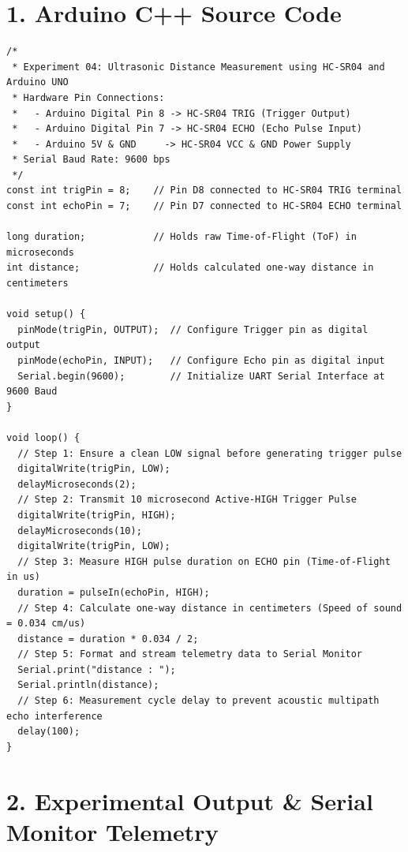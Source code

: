 \documentclass[10pt,a4paper]{article}
\begin{document}
\section*{1. Arduino C++ Source Code}
\begin{lstlisting}[style=bwCode, title={\textbf{Listing 4.1: Microcontroller Firmware for Ultrasonic Distance Measurement.}}]
/*
 * Experiment 04: Ultrasonic Distance Measurement using HC-SR04 and Arduino UNO
 * Hardware Pin Connections:
 *   - Arduino Digital Pin 8 -> HC-SR04 TRIG (Trigger Output)
 *   - Arduino Digital Pin 7 -> HC-SR04 ECHO (Echo Pulse Input)
 *   - Arduino 5V & GND     -> HC-SR04 VCC & GND Power Supply
 * Serial Baud Rate: 9600 bps
 */
const int trigPin = 8;    // Pin D8 connected to HC-SR04 TRIG terminal
const int echoPin = 7;    // Pin D7 connected to HC-SR04 ECHO terminal

long duration;            // Holds raw Time-of-Flight (ToF) in microseconds
int distance;             // Holds calculated one-way distance in centimeters

void setup() {
  pinMode(trigPin, OUTPUT);  // Configure Trigger pin as digital output
  pinMode(echoPin, INPUT);   // Configure Echo pin as digital input
  Serial.begin(9600);        // Initialize UART Serial Interface at 9600 Baud
}

void loop() {
  // Step 1: Ensure a clean LOW signal before generating trigger pulse
  digitalWrite(trigPin, LOW);
  delayMicroseconds(2);
  // Step 2: Transmit 10 microsecond Active-HIGH Trigger Pulse
  digitalWrite(trigPin, HIGH);
  delayMicroseconds(10);
  digitalWrite(trigPin, LOW);
  // Step 3: Measure HIGH pulse duration on ECHO pin (Time-of-Flight in us)
  duration = pulseIn(echoPin, HIGH);
  // Step 4: Calculate one-way distance in centimeters (Speed of sound = 0.034 cm/us)
  distance = duration * 0.034 / 2;
  // Step 5: Format and stream telemetry data to Serial Monitor
  Serial.print("distance : ");
  Serial.println(distance);
  // Step 6: Measurement cycle delay to prevent acoustic multipath echo interference
  delay(100);
}
\end{lstlisting}

\vspace{0.06cm}
\section*{2. Experimental Output \& Serial Monitor Telemetry}
\end{document}
